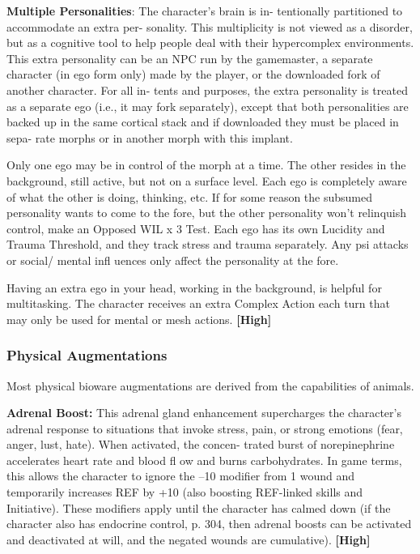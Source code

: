 \textbf{Multiple Personalities}: The character's brain is in-
tentionally partitioned to accommodate an extra per-
sonality. This multiplicity is not viewed as a disorder, 
but as a cognitive tool to help people deal with their 
hypercomplex environments. This extra personality 
can be an NPC run by the gamemaster, a separate 
character (in ego form only) made by the player, or 
the downloaded fork of another character. For all in-
tents and purposes, the extra personality is treated as 
a separate ego (i.e., it may fork separately), except that 
both personalities are backed up in the same cortical 
stack and if downloaded they must be placed in sepa-
rate morphs or in another morph with this implant.

Only one ego may be in control of the morph at a 
time. The other resides in the background, still active, 
but not on a surface level. Each ego is completely 
aware of what the other is doing, thinking, etc. If for 
some reason the subsumed personality wants to come 
to the fore, but the other personality won't relinquish 
control, make an Opposed WIL x 3 Test. Each ego has 
its own Lucidity and Trauma Threshold, and they track 
stress and trauma separately. Any psi attacks or social/
mental infl uences only affect the personality at the fore.

Having an extra ego in your head, working in the 
background, is helpful for multitasking. The character 
receives an extra Complex Action each turn that may 
only be used for mental or mesh actions. \textbf{[High]}

\subsubsection{Physical Augmentations}

Most physical bioware augmentations are derived 
from the capabilities of animals.

\textbf{Adrenal Boost:} This adrenal gland enhancement 
supercharges the character's adrenal response to 
situations that invoke stress, pain, or strong emotions 
(fear, anger, lust, hate). When activated, the concen-
trated burst of norepinephrine accelerates heart rate 
and blood fl ow and burns carbohydrates. In game 
terms, this allows the character to ignore the –10 
modifier from 1 wound and temporarily increases 
REF by +10 (also boosting REF-linked skills and 
Initiative). These modifiers apply until the character 
has calmed down (if the character also has endocrine 
control, p. 304, then adrenal boosts can be activated 
and deactivated at will, and the negated wounds are 
cumulative). \textbf{[High]}

